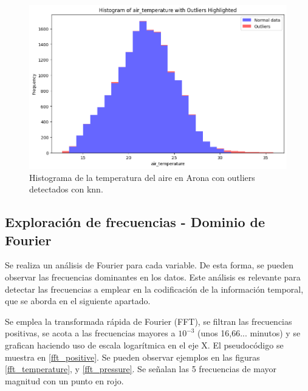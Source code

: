 \begin{figure}
    \centering
    \includegraphics[width=.5\linewidth]{images/histogram_temperature_knn.png}
    \caption{Histograma de la temperatura del aire en Arona con outliers detectados con knn.}
    \label{histogram_knn_temperature}
\end{figure}

\subsection{Exploración de frecuencias - Dominio de Fourier}
Se realiza un análisis de Fourier para cada variable. De esta forma, se pueden observar las frecuencias dominantes en los datos. Este análisis
es relevante para detectar las frecuencias a emplear en la codificación de la información temporal, que se aborda en el siguiente apartado.

Se emplea la transformada rápida de Fourier (FFT), se filtran las frecuencias positivas, se acota a las frecuencias mayores a \(10^{-3}\) 
 (unos 16,66... minutos) y se grafican haciendo uso de escala logarítmica en el eje X. El pseudocódigo se muestra en \ref{fft_positive}. Se pueden observar ejemplos en las figuras \ref{fft_temperature},
 y \ref{fft_pressure}. Se señalan las 5 frecuencias de mayor magnitud con un punto en rojo. 

